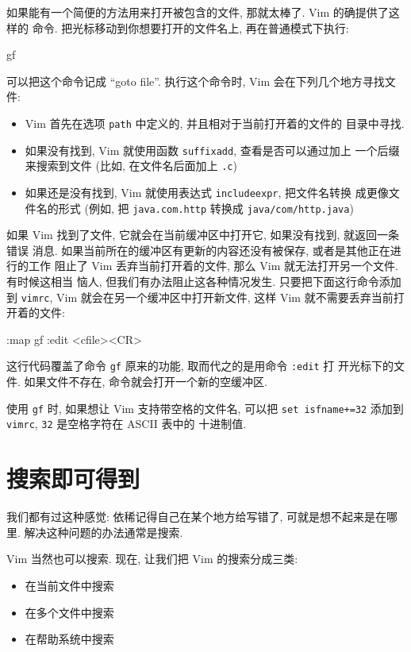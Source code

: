 如果能有一个简便的方法用来打开被包含的文件, 那就太棒了. Vim 的确提供了这样的
命令. 把光标移动到你想要打开的文件名上, 再在普通模式下执行:
\begin{vimcode}
gf
\end{vimcode}
可以把这个命令记成 ``goto file''. 执行这个命令时, Vim 会在下列几个地方寻找文件:
\begin{itemize}
    \item Vim 首先在选项 \texttt{path} 中定义的, 并且相对于当前打开着的文件的
        目录中寻找.
    \item 如果没有找到, Vim 就使用函数 \texttt{suffixadd}, 查看是否可以通过加上
        一个后缀来搜索到文件 (比如, 在文件名后面加上 \texttt{.c})
    \item 如果还是没有找到, Vim 就使用表达式 \texttt{includeexpr}, 把文件名转换
        成更像文件名的形式 (例如, 把 \texttt{java.com.http} 转换成
        \texttt{java/com/http.java})
\end{itemize}

如果 Vim 找到了文件, 它就会在当前缓冲区中打开它, 如果没有找到, 就返回一条错误
消息. 如果当前所在的缓冲区有更新的内容还没有被保存, 或者是其他正在进行的工作
阻止了 Vim 丢弃当前打开着的文件, 那么 Vim 就无法打开另一个文件. 有时候这相当
恼人, 但我们有办法阻止这各种情况发生. 只要把下面这行命令添加到 \texttt{vimrc},
Vim 就会在另一个缓冲区中打开新文件, 这样 Vim 就不需要丢弃当前打开着的文件:
\begin{vimcode}
:map gf :edit <cfile><CR>
\end{vimcode}
这行代码覆盖了命令 \texttt{gf} 原来的功能, 取而代之的是用命令 \texttt{:edit} 打
开光标下的文件. 如果文件不存在, 命令就会打开一个新的空缓冲区.

\begin{warning}
    使用 \texttt{gf} 时, 如果想让 Vim 支持带空格的文件名, 可以把 \texttt{set
    isfname+=32} 添加到 \texttt{vimrc}, \texttt{32} 是空格字符在 ASCII 表中的
    十进制值.
\end{warning}

\section{搜索即可得到}
\label{sec:search_and_you_will_find}

我们都有过这种感觉: 依稀记得自己在某个地方给写错了, 可就是想不起来是在哪里.
解决这种问题的办法通常是搜索.

Vim 当然也可以搜索. 现在, 让我们把 Vim 的搜索分成三类:
\begin{itemize}
    \item 在当前文件中搜索
    \item 在多个文件中搜索
    \item 在帮助系统中搜索
\end{itemize}


